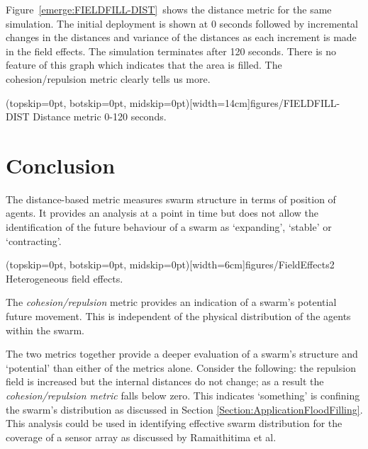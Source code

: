 \documentclass{ieeeaccess}
\begin{document}
Figure~\ref{emerge:FIELDFILL-DIST}~shows the distance metric for the same simulation. The initial deployment is shown at 0 seconds followed by incremental changes in the distances and variance of the distances as each increment is made in the field effects. The simulation terminates after 120 seconds. There is no feature of this graph which indicates that the area is filled. The cohesion/repulsion metric clearly tells us more. 

\Figure[t!](topskip=0pt, botskip=0pt, midskip=0pt)[width=14cm]{figures/FIELDFILL-DIST}
{Distance metric 0-120 seconds.\label{emerge:FIELDFILL-DIST}}


\section{Conclusion}\label{Section:MagnitudeDistanceComparison}
The distance-based metric measures swarm structure in terms of position of agents. It provides an analysis at a point in time but does not allow the identification of the future behaviour of a swarm as `expanding', `stable' or `contracting'. 

\Figure[t!](topskip=0pt, botskip=0pt, midskip=0pt)[width=6cm]{figures/FieldEffects2}
{Heterogeneous field effects.\label{additional:fieldsWork}}

The \textit{cohesion/repulsion} metric provides an indication of a swarm's potential future movement. This is independent of the physical distribution of the agents within the swarm. 

The two metrics together provide a deeper evaluation of a swarm's structure and `potential' than either of the metrics alone. Consider the following: the repulsion field is increased but the internal distances do not change; as a result the \textit{cohesion/repulsion metric} falls below zero. This indicates `something' is confining the swarm's distribution as discussed in Section \ref{Section:ApplicationFloodFilling}. This analysis could be used in identifying effective swarm distribution for the coverage of a sensor array as discussed by Ramaithitima et al.~\cite{RWBK:15}
\end{document}
